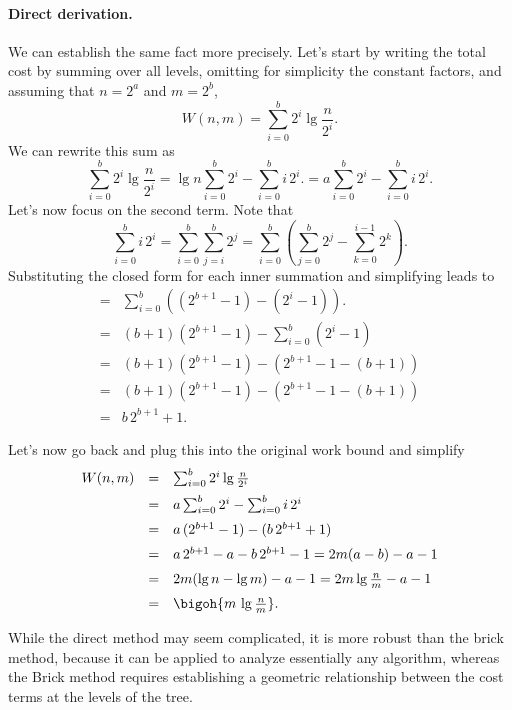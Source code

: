 \paragraph{Direct derivation.}
We can establish the same fact more precisely.  Let's start by writing
the total cost by summing over all levels, omitting for simplicity the
constant factors, and assuming that $n = 2^a$ and $m = 2^b$,
\[
W(n,m) = \sum_{i = 0}^{b}{2^i \lg{\frac{n}{2^i}}}.
\]
We can rewrite this sum as 
\[
\sum_{i = 0}^{b}{2^i \lg{\frac{n}{2^i}}} = 
\lg{n}\sum_{i = 0}^{b}{2^i} - \sum_{i = 0}^{b}{i\,2^i}.
= a\sum_{i = 0}^{b}{2^i} - \sum_{i = 0}^{b}{i\,2^i}.
\]
Let's now focus on the second term. Note that 
\[
\sum_{i = 0}^{b}{i\,2^i} 
=
\sum_{i = 0}^{b}{\sum_{j=i}^{b}2^j} 
=
\sum_{i = 0}^{b}{\left(\sum_{j=0}^{b}{2^j} - \sum_{k=0}^{i-1}2^k\right). }
\]
Substituting the closed form for each inner summation and simplifying
leads to
\[
\begin{array}{ll}
= & \sum_{i = 0}^{b}{\left( (2^{b+1}-1) - (2^{i}-1) \right)}.
\\[2mm]
= &  (b+1) (2^{b+1}-1) - \sum_{i = 0}^{b}{(2^{i}-1)}
\\[2mm]
= &  (b+1) (2^{b+1}-1) - \left( 2^{b+1}-1 - (b+1) \right)
\\[2mm]
= &  (b+1) (2^{b+1}-1) - \left( 2^{b+1}-1 - (b+1) \right)
\\[2mm]
= &  b\,2^{b+1} + 1.
\end{array}
\]

Let's now go back and plug this into the original work bound and simplify
\[
\begin{array}{lll}
W(n,m) & = &\sum_{i = 0}^{b}{2^i \lg{\frac{n}{2^i}}}
\\[2mm]
& = & a\sum_{i = 0}^{b}{2^i} - \sum_{i = 0}^{b}{i\,2^i}
\\[2mm]
& = & a\,(2^{b+1}-1) -  (b\,2^{b+1} + 1)
\\[2mm]
& = & a\,2^{b+1}-a - b\,2^{b+1} -1
= 2m (a-b) - a -1
\\[2mm]
& = & 2m (\lg{n}-\lg{m}) - a -1
= 2m \lg{\frac{n}{m}} - a -1
\\[2mm]
& = & \bigoh{m \, \lg{\frac{n}{m}}}.
\end{array}
\]

While the direct method may seem complicated, it is more robust than
the brick method, because it can be applied to analyze essentially any
algorithm, whereas the Brick method requires establishing a geometric
relationship between the cost terms at the levels of the tree.
%


